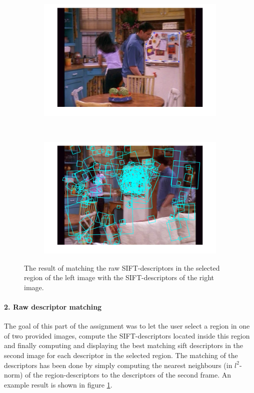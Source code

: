 \documentclass{paper}
\begin{document}
\begin{figure}[h!]
    \centering
    \begin{subfigure}[]{0.5\textwidth}
        \centering
        \includegraphics[width=\textwidth]{rawMatchSel.png}
    \end{subfigure}%
    ~ 
    \begin{subfigure}[]{0.5\textwidth}
        \centering
        \includegraphics[width=\textwidth]{rawMatchRes.png}
    \end{subfigure}
    \caption{The result of matching the raw SIFT-descriptors in the selected region of the left image with the SIFT-descriptors of the right image.}
\label{fig:rawMatch}
\end{figure}

\paragraph{2. Raw descriptor matching}
The goal of this part of the assignment was to let the user select a region in one of two provided images, compute the SIFT-descriptors located inside this region and finally computing and displaying the best matching sift descriptors in the second image for each descriptor in the selected region. The matching of the descriptors has been done by simply computing the nearest neighbours (in $l^2$-norm) of the region-descriptors to the descriptors of the second frame. An example result is shown in figure \ref{fig:rawMatch}.
\end{document}
